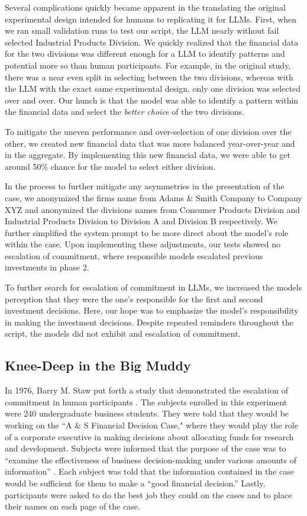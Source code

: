 \documentclass{article}
\begin{document}
Several complications quickly became apparent in the translating the original experimental design intended for humans to replicating it for LLMs. First, when we ran small validation runs to test our script, the LLM nearly without fail selected Industrial Products Division. We quickly realized that the financial data for the two divisions was different enough for a LLM to identify patterns and potential more so than human participants. For example, in the original study, there was a near even split in selecting between the two divisions, whereas with the LLM with the exact same experimental design, only one division was selected over and over. Our hunch is that the model was able to identify a pattern within the financial data and select the \textit{better choice} of the two divisions. 

To mitigate the uneven performance and over-selection of one division over the other, we created new financial data that was more balanced year-over-year and in the aggregate. By implementing this new financial data, we were able to get around 50\% chance for the model to select either division.

In the process to further mitigate any asymmetries in the presentation of the case, we anonymized the firms name from Adams \& Smith Company to Company XYZ and anonymized the divisions names from Consumer Products Division and Industrial Products Division to Division A and Division B respectively. We further simplified the system prompt to be more direct about the model's role within the case. Upon implementing these adjustments, our tests showed no escalation of commitment, where responsible models escalated previous investments in phase 2. 

To further search for escalation of commitment in LLMs, we increased the models perception that they were the one's responsible for the first and second investment decisions. Here, our hope was to emphasize the model's responsibility in making the investment decisions. Despite repeated reminders throughout the script, the models did not exhibit and escalation of commitment.

\subsection{Knee-Deep in the Big Muddy}

In 1976, Barry M. Staw put forth a study that demonstrated the escalation of commitment in human participants \cite{Staw-1976}. The subjects enrolled in this experiment were 240 undergraduate business students. They were told that they would be working on the ``A \& S Financial Decision Case," where they would play the role of a corporate executive in making decisions about allocating funds for research and development. Subjects were informed that the purpose of the case was to ``examine the effectiveness of business decision-making under various amounts of information'' \cite{Staw-1976}. Each subject was told that the information contained in the case would be sufficient for them to make a ``good financial decision.'' Lastly, participants were asked to do the best job they could on the cases and to place their names on each page of the case.
\end{document}
